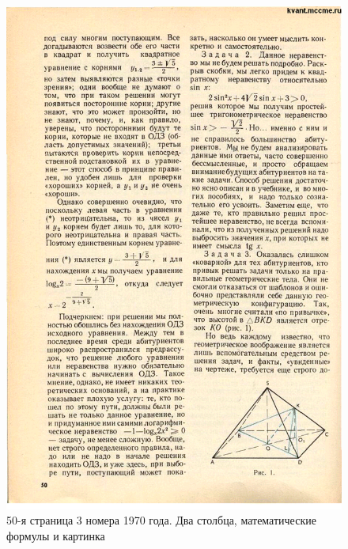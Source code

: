 \begin{figure}[!htb]
   \begin{minipage}{0.48\textwidth}
     \centering
     \includegraphics[width=.85\linewidth]{kvant_70_03-50.png}
     \caption{\footnotesize{50-я страница 3 номера 1970 года. Два столбца, математические формулы и картинка}}\label{fig:kvant-70-page}
   \end{minipage}\hfill
   \begin{minipage}{0.48\textwidth}
     \centering

\end{minipage}
\end{figure}
